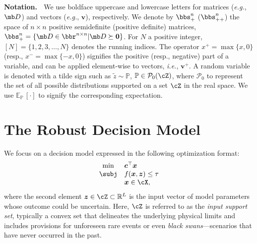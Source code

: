 \documentclass[mnsc, nonblindrev]{informswp}
\newcommand{\1}[1]{\mathds{1}{\left(#1\right)}}
\begin{document}
\noindent\textbf{Notation.} $\;$
We use boldface uppercase and lowercase letters for matrices (\textit{e.g.}, $\mb D$) and vectors (\textit{e.g.}, $\bm v$), respectively. We denote by $\bbs_+^n$ ($\bbs_{++}^n$) the space of $n \times n$ positive semidefinite (positive definite) matrices, \ie $\bbs_+^n = \{ \mb D \in \bbr^{n \times n} | \mb D \succeq \bm 0 \}$. For $N$ a positive integer, $[N] = \{1,2,3,\ldots,N\}$ denotes the running indices. The operator $x^+ = \max\{x, 0\}$ (resp., $x^- = \max\{-x, 0\}$) signifies the positive (resp., negative) part of a variable, and can be applied element-wise to vectors, \textit{i.e.}, $\bm{v}^+$. A random variable is denoted with a tilde sign such as $\tilde{z} \sim \mathbb{P}$, $\mathbb{P} \in \mathcal{P}_0(\cZ)$, where $\mathcal{P}_0$ to represent the set of all possible distributions supported on a set $\cZ$ in the real space. We use $\mathbb{E}_{\mathbb{P}}\,[\cdot]$ to signify the corresponding expectation.


\section{The Robust Decision Model}

We focus on a decision model expressed in the following optimization format:
\[
\begin{array}{cl}
\min & \bm c^\top \bm x \\
\subj & f(\bm x,\bm z) \leq \tau \\
& \bm x \in \cX,
\end{array}
\]
where the second element ${\bm z} \in \cZ \subset \mathbb{R}^{L}$ is the input vector of model parameters whose outcome could be uncertain. 
Here, $\cZ$ is referred to as the \textit{input support set}, typically a convex set that delineates the underlying physical limits and includes provisions for unforeseen rare events or even \textit{black swans}---scenarios that have never occurred in the past. 
\end{document}
